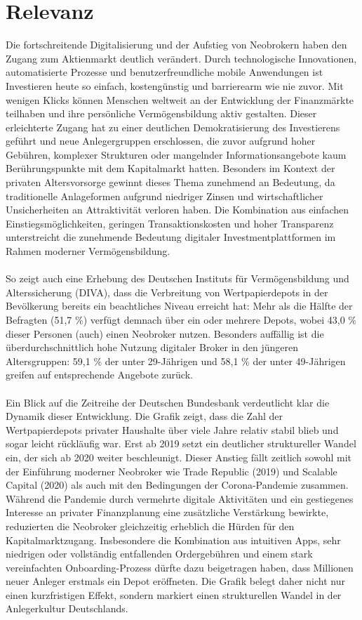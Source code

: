\documentclass{article}
\begin{document}
\newpage

\section{Relevanz}
Die fortschreitende Digitalisierung und der Aufstieg von Neobrokern haben den Zugang zum Aktienmarkt deutlich verändert. Durch technologische Innovationen, automatisierte Prozesse und benutzerfreundliche mobile Anwendungen ist Investieren heute so einfach, kostengünstig und barrierearm wie nie zuvor. Mit wenigen Klicks können Menschen weltweit an der Entwicklung der Finanzmärkte teilhaben und ihre persönliche Vermögensbildung aktiv gestalten. Dieser erleichterte Zugang hat zu einer deutlichen Demokratisierung des Investierens geführt und neue Anlegergruppen erschlossen, die zuvor aufgrund hoher Gebühren, komplexer Strukturen oder mangelnder Informationsangebote kaum Berührungspunkte mit dem Kapitalmarkt hatten. Besonders im Kontext der privaten Altersvorsorge gewinnt dieses Thema zunehmend an Bedeutung, da traditionelle Anlageformen aufgrund niedriger Zinsen und wirtschaftlicher Unsicherheiten an Attraktivität verloren haben. Die Kombination aus einfachen Einstiegsmöglichkeiten, geringen Transaktionskosten und hoher Transparenz unterstreicht die zunehmende Bedeutung digitaler Investmentplattformen im Rahmen moderner Vermögensbildung.
\\\\
So zeigt auch eine Erhebung des Deutschen Instituts für Vermögensbildung und Alterssicherung (DIVA), dass die Verbreitung von Wertpapierdepots in der Bevölkerung bereits ein beachtliches Niveau erreicht hat: Mehr als die Hälfte der Befragten (51,7 \%) verfügt demnach über ein oder mehrere Depots, wobei 43,0 \% dieser Personen (auch) einen Neobroker nutzen. Besonders auffällig ist die überdurchschnittlich hohe Nutzung digitaler Broker in den jüngeren Altersgruppen: 59,1 \% der unter 29-Jährigen und 58,1 \% der unter 49-Jährigen greifen auf entsprechende Angebote zurück.
\\\\
Ein Blick auf die Zeitreihe der Deutschen Bundesbank verdeutlicht klar die Dynamik dieser Entwicklung. Die Grafik zeigt, dass die Zahl der Wertpapierdepots privater Haushalte über viele Jahre relativ stabil blieb und sogar leicht rückläufig war. Erst ab 2019 setzt ein deutlicher struktureller Wandel ein, der sich ab 2020 weiter beschleunigt. Dieser Anstieg fällt zeitlich sowohl mit der Einführung moderner Neobroker wie Trade Republic (2019) und Scalable Capital (2020) als auch mit den Bedingungen der Corona-Pandemie zusammen. Während die Pandemie durch vermehrte digitale Aktivitäten und ein gestiegenes Interesse an privater Finanzplanung eine zusätzliche Verstärkung bewirkte, reduzierten die Neobroker gleichzeitig erheblich die Hürden für den Kapitalmarktzugang. Insbesondere die Kombination aus intuitiven Apps, sehr niedrigen oder vollständig entfallenden Ordergebühren und einem stark vereinfachten Onboarding-Prozess dürfte dazu beigetragen haben, dass Millionen neuer Anleger erstmals ein Depot eröffneten. Die Grafik belegt daher nicht nur einen kurzfristigen Effekt, sondern markiert einen strukturellen Wandel in der Anlegerkultur Deutschlands.
\end{document}
